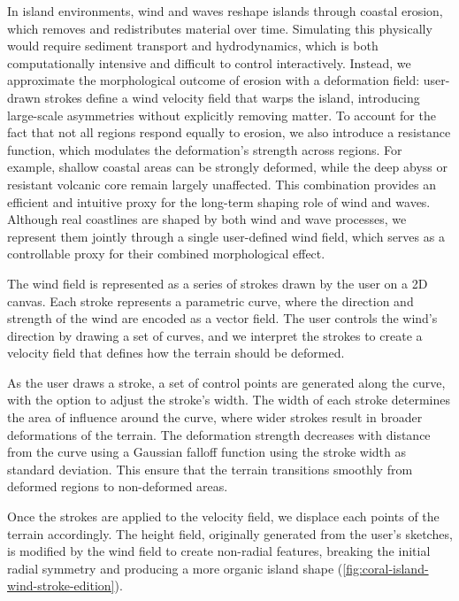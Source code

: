 In island environments, wind and waves reshape islands through coastal erosion, which removes and redistributes material over time. Simulating this physically would require sediment transport and hydrodynamics, which is both computationally intensive and difficult to control interactively. Instead, we approximate the morphological outcome of erosion with a deformation field: user-drawn strokes define a wind velocity field that warps the island, introducing large-scale asymmetries without explicitly removing matter. To account for the fact that not all regions respond equally to erosion, we also introduce a resistance function, which modulates the deformation's strength across regions. For example, shallow coastal areas can be strongly deformed, while the deep abyss or resistant volcanic core remain largely unaffected. This combination provides an efficient and intuitive proxy for the long-term shaping role of wind and waves.
Although real coastlines are shaped by both wind and wave processes, we represent them jointly through a single user-defined wind field, which serves as a controllable proxy for their combined morphological effect.

The wind field is represented as a series of strokes drawn by the user on a 2D canvas. Each stroke represents a parametric curve, where the direction and strength of the wind are encoded as a vector field. The user controls the wind's direction by drawing a set of curves, and we interpret the strokes to create a velocity field that defines how the terrain should be deformed.

As the user draws a stroke, a set of control points are generated along the curve, with the option to adjust the stroke's width. The width of each stroke determines the area of influence around the curve, where wider strokes result in broader deformations of the terrain.
The deformation strength decreases with distance from the curve using a Gaussian falloff function using the stroke width as standard deviation. This ensure that the terrain transitions smoothly from deformed regions to non-deformed areas.

Once the strokes are applied to the velocity field, we displace each points of the terrain accordingly. The height field, originally generated from the user's sketches, is modified by the wind field to create non-radial features, breaking the initial radial symmetry and producing a more organic island shape (\cref{fig:coral-island-wind-stroke-edition}).


